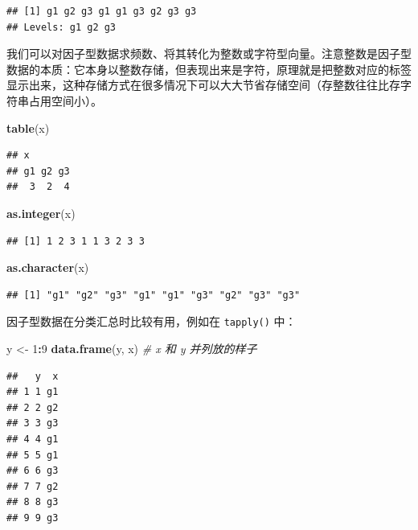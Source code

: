 \documentclass[
  b5paper,
  UTF8,twoside]{book}
\newenvironment{Shaded}{\begin{snugshade}}{\end{snugshade}}
\newcommand{\CommentTok}[1]{\textcolor[rgb]{0.56,0.35,0.01}{\textit{#1}}}
\newcommand{\DecValTok}[1]{\textcolor[rgb]{0.00,0.00,0.81}{#1}}
\newcommand{\FunctionTok}[1]{\textcolor[rgb]{0.13,0.29,0.53}{\textbf{#1}}}
\newcommand{\NormalTok}[1]{#1}
\newcommand{\OtherTok}[1]{\textcolor[rgb]{0.56,0.35,0.01}{#1}}
\newcommand{\SpecialCharTok}[1]{\textcolor[rgb]{0.81,0.36,0.00}{\textbf{#1}}}
\begin{document}
\begin{verbatim}
## [1] g1 g2 g3 g1 g1 g3 g2 g3 g3
## Levels: g1 g2 g3
\end{verbatim}

我们可以对因子型数据求频数、将其转化为整数或字符型向量。注意整数是因子型数据的本质：它本身以整数存储，但表现出来是字符，原理就是把整数对应的标签显示出来，这种存储方式在很多情况下可以大大节省存储空间（存整数往往比存字符串占用空间小）。

\begin{Shaded}
\begin{Highlighting}[]
\FunctionTok{table}\NormalTok{(x)}
\end{Highlighting}
\end{Shaded}

\begin{verbatim}
## x
## g1 g2 g3 
##  3  2  4
\end{verbatim}

\begin{Shaded}
\begin{Highlighting}[]
\FunctionTok{as.integer}\NormalTok{(x)}
\end{Highlighting}
\end{Shaded}

\begin{verbatim}
## [1] 1 2 3 1 1 3 2 3 3
\end{verbatim}

\begin{Shaded}
\begin{Highlighting}[]
\FunctionTok{as.character}\NormalTok{(x)}
\end{Highlighting}
\end{Shaded}

\begin{verbatim}
## [1] "g1" "g2" "g3" "g1" "g1" "g3" "g2" "g3" "g3"
\end{verbatim}

因子型数据在分类汇总时比较有用，例如在 \texttt{tapply()} 中：

\begin{Shaded}
\begin{Highlighting}[]
\NormalTok{y }\OtherTok{\textless{}{-}} \DecValTok{1}\SpecialCharTok{:}\DecValTok{9}
\FunctionTok{data.frame}\NormalTok{(y, x) }\CommentTok{\# x 和 y 并列放的样子}
\end{Highlighting}
\end{Shaded}

\begin{verbatim}
##   y  x
## 1 1 g1
## 2 2 g2
## 3 3 g3
## 4 4 g1
## 5 5 g1
## 6 6 g3
## 7 7 g2
## 8 8 g3
## 9 9 g3
\end{verbatim}
\end{document}
